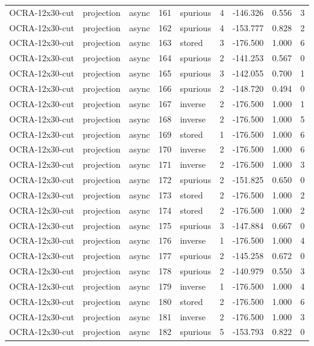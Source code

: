 \begin{tabular}{lllrlrrrr}
OCRA-12x30-cut & projection & async & 161 & spurious & 4 & -146.326 & 0.556 & 3 \\
OCRA-12x30-cut & projection & async & 162 & spurious & 4 & -153.777 & 0.828 & 2 \\
OCRA-12x30-cut & projection & async & 163 & stored & 3 & -176.500 & 1.000 & 6 \\
OCRA-12x30-cut & projection & async & 164 & spurious & 2 & -141.253 & 0.567 & 0 \\
OCRA-12x30-cut & projection & async & 165 & spurious & 3 & -142.055 & 0.700 & 1 \\
OCRA-12x30-cut & projection & async & 166 & spurious & 2 & -148.720 & 0.494 & 0 \\
OCRA-12x30-cut & projection & async & 167 & inverse & 2 & -176.500 & 1.000 & 1 \\
OCRA-12x30-cut & projection & async & 168 & inverse & 2 & -176.500 & 1.000 & 5 \\
OCRA-12x30-cut & projection & async & 169 & stored & 1 & -176.500 & 1.000 & 6 \\
OCRA-12x30-cut & projection & async & 170 & inverse & 2 & -176.500 & 1.000 & 6 \\
OCRA-12x30-cut & projection & async & 171 & inverse & 2 & -176.500 & 1.000 & 3 \\
OCRA-12x30-cut & projection & async & 172 & spurious & 2 & -151.825 & 0.650 & 0 \\
OCRA-12x30-cut & projection & async & 173 & stored & 2 & -176.500 & 1.000 & 2 \\
OCRA-12x30-cut & projection & async & 174 & stored & 2 & -176.500 & 1.000 & 2 \\
OCRA-12x30-cut & projection & async & 175 & spurious & 3 & -147.884 & 0.667 & 0 \\
OCRA-12x30-cut & projection & async & 176 & inverse & 1 & -176.500 & 1.000 & 4 \\
OCRA-12x30-cut & projection & async & 177 & spurious & 2 & -145.258 & 0.672 & 0 \\
OCRA-12x30-cut & projection & async & 178 & spurious & 2 & -140.979 & 0.550 & 3 \\
OCRA-12x30-cut & projection & async & 179 & inverse & 1 & -176.500 & 1.000 & 4 \\
OCRA-12x30-cut & projection & async & 180 & stored & 2 & -176.500 & 1.000 & 6 \\
OCRA-12x30-cut & projection & async & 181 & inverse & 2 & -176.500 & 1.000 & 3 \\
OCRA-12x30-cut & projection & async & 182 & spurious & 5 & -153.793 & 0.822 & 0 \\

\end{tabular}
